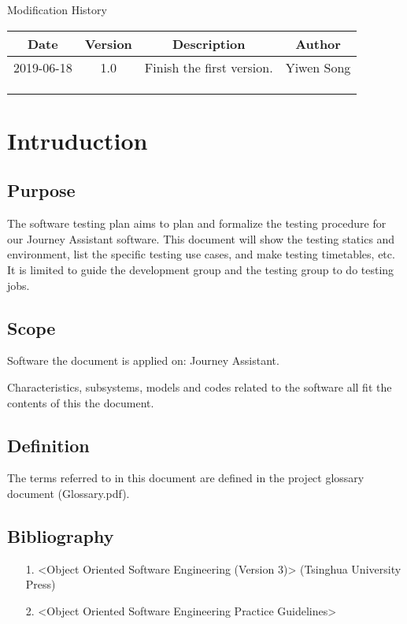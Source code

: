 \documentclass[10pt]{article}
\begin{document}
\newpage

\begin{center}
    {\LARGE Modification History}
    
    \begin{tabular}{|c|c|c|c|} 
        \hline 
        Date&Version&Description&Author\\
        \hline  
        2019-06-18&1.0&Finish the first version.&Yiwen Song\\
		\hline 
		& & & \\
		\hline
		& & & \\
		\hline
		& & & \\
		\hline
    \end{tabular}    
\end{center}

\newpage

\tableofcontents
\newpage

\section{Intruduction}
\subsection{Purpose}
The software testing plan aims to plan and formalize the testing procedure for our Journey Assistant software. This document will show the testing statics and environment, list the specific testing use cases, and make testing timetables, etc. It is limited to guide the development group and the testing group to do testing jobs.

\subsection{Scope}
Software the document is applied on: Journey Assistant.

Characteristics, subsystems, models and codes related to the software all fit the contents of this the document.

\subsection{Definition}
The terms referred to in this document are defined in the project glossary document (Glossary.pdf).

\subsection{Bibliography}
\begin{itemize}
	\item[1.] <Object Oriented Software Engineering (Version 3)> (Tsinghua University Press)
	\item[2.] <Object Oriented Software Engineering Practice Guidelines> 
\end{itemize}
\end{document}
